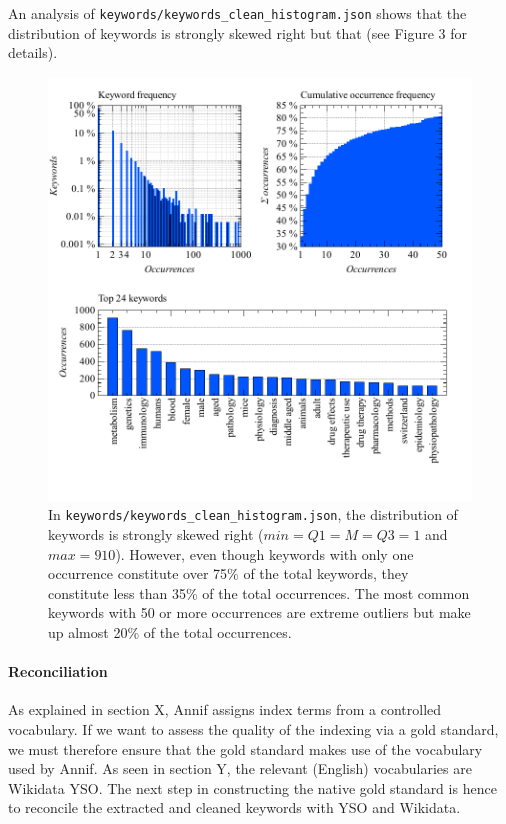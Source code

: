 An analysis of \texttt{keywords/keywords\_clean\_histogram.json} shows
that the distribution of keywords is strongly skewed right but that (see
Figure 3 for details).

\begin{figure}
\centering
\includegraphics{images/keywords_clean_histogram_abc.pdf}
\caption{In \texttt{keywords/keywords\_clean\_histogram.json}, the
distribution of keywords is strongly skewed right
(\(min = Q1 = M = Q3 = 1\) and \(max = 910\)). However, even though
keywords with only one occurrence constitute over 75\% of the total
keywords, they constitute less than 35\% of the total occurrences. The
most common keywords with 50 or more occurrences are extreme outliers
but make up almost 20\% of the total occurrences.}
\end{figure}

\hypertarget{reconciliation}{%
\paragraph{Reconciliation}\label{reconciliation}}

As explained in section X, Annif assigns index terms from a controlled
vocabulary. If we want to assess the quality of the indexing via a gold
standard, we must therefore ensure that the gold standard makes use of
the vocabulary used by Annif. As seen in section Y, the relevant
(English) vocabularies are Wikidata YSO. The next step in constructing
the native gold standard is hence to reconcile the extracted and cleaned
keywords with YSO and Wikidata.

